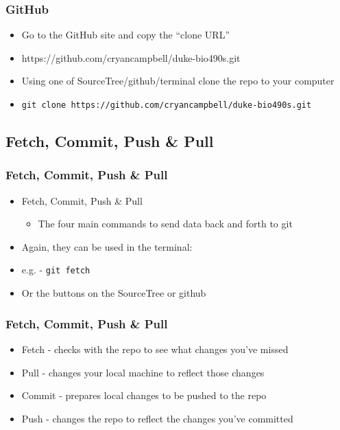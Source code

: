 \documentclass[14pt]{beamer}
\begin{document}
\begin{frame}
\frametitle{GitHub}
\begin{itemize}
	\item<+-> Go to the GitHub site and copy the ``clone URL''
	\item<+-> https://github.com/cryancampbell/duke-bio490s.git
	\item<+-> Using one of SourceTree/github/terminal clone the repo to your computer
	\item<+-> \texttt{git clone https://github.com/cryancampbell/duke-bio490s.git}
\end{itemize}
\end{frame}

\subsection{Fetch, Commit, Push \& Pull}

\begin{frame}
\frametitle{Fetch, Commit, Push \& Pull}
\begin{itemize}
	\item<+-> Fetch, Commit, Push \& Pull
	\begin{itemize}
		\item<+-> The four main commands to send data back and forth to git
	\end{itemize}
	\item<+-> Again, they can be used in the terminal:
	\item<+-> e.g. - \texttt{git fetch}
	\item<+-> Or the buttons on the SourceTree or github
\end{itemize}
\end{frame}

\begin{frame}
\frametitle{Fetch, Commit, Push \& Pull}
\begin{itemize}
	\item<+-> Fetch - checks with the repo to see what changes you've missed
	\item<+-> Pull - changes your local machine to reflect those changes
	\item<+-> Commit - prepares local changes to be pushed to the repo
	\item<+-> Push - changes the repo to reflect the changes you've committed
\end{itemize}
\end{frame}
\end{document}
